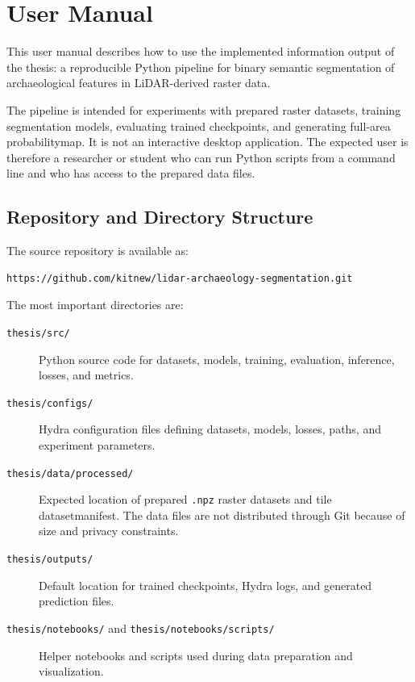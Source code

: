 
\chapter{User Manual}\label{app:user.manual}

\begin{sloppypar}

This user manual describes how to use the implemented information output of the thesis: a reproducible Python pipeline for binary semantic segmentation of archaeological features in LiDAR-derived raster data.

The pipeline is intended for experiments with prepared raster datasets, training segmentation models, evaluating trained checkpoints, and generating full-area \gls{probabilitymap}. It is not an interactive desktop application. The expected user is therefore a researcher or student who can run Python scripts from a command line and who has access to the prepared data files.

\section{Repository and Directory Structure}

The source repository is available as:

\begin{verbatim}
https://github.com/kitnew/lidar-archaeology-segmentation.git
\end{verbatim}

The most important directories are:

\begin{description}
    \item[\texttt{thesis/src/}] Python source code for datasets, models, training, evaluation, inference, losses, and metrics.
    \item[\texttt{thesis/configs/}] Hydra configuration files defining datasets, models, losses, paths, and experiment parameters.
    \item[\texttt{thesis/data/processed/}] Expected location of prepared \texttt{.npz} raster datasets and tile \gls{datasetmanifest}. The data files are not distributed through Git because of size and privacy constraints.
    \item[\texttt{thesis/outputs/}] Default location for trained checkpoints, Hydra logs, and generated prediction files.
    \item[\texttt{thesis/notebooks/} and \texttt{thesis/notebooks/scripts/}] Helper notebooks and scripts used during data preparation and visualization.
\end{description}


\end{sloppypar}

